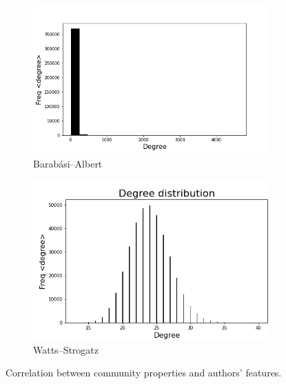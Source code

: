 \documentclass[sigchi]{acmart}
\begin{document}
\begin{figure}[]
\hfill
\begin{subfigure}{.45\columnwidth}
  \centering
  \includegraphics[width=\columnwidth]{report/img/ba_degr.png}
  \caption{Barabási–Albert}
  \label{fig:sub-ba}
\end{subfigure}
\hfill
\begin{subfigure}{.45\columnwidth}
  \centering
  \includegraphics[width=\columnwidth]{report/img/ws_degr.png}
  \caption{Watts–Strogatz}
  \label{fig:sub-ws}
\end{subfigure}
\hfill
\label{fig:commCorrelation}
\caption{Correlation between community properties and authors' features.}
\end{figure}
\end{document}
